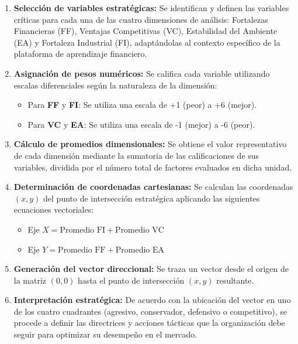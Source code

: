 \begin{enumerate}
	\item \textbf{Selección de variables estratégicas:} Se identifican y definen las variables críticas para cada una de las cuatro dimensiones de análisis: Fortalezas Financieras (FF), Ventajas Competitivas (VC), Estabilidad del Ambiente (EA) y Fortaleza Industrial (FI), adaptándolas al contexto específico de la plataforma de aprendizaje financiero.
	
	\item \textbf{Asignación de pesos numéricos:} Se califica cada variable utilizando escalas diferenciales según la naturaleza de la dimensión:
	\begin{itemize}
		\item Para \textbf{FF} y \textbf{FI}: Se utiliza una escala de +1 (peor) a +6 (mejor).
		\item Para \textbf{VC} y \textbf{EA}: Se utiliza una escala de -1 (mejor) a -6 (peor).
	\end{itemize}
	
	\item \textbf{Cálculo de promedios dimensionales:} Se obtiene el valor representativo de cada dimensión mediante la sumatoria de las calificaciones de sus variables, dividida por el número total de factores evaluados en dicha unidad.
	
	\item \textbf{Determinación de coordenadas cartesianas:} Se calculan las coordenadas $(x, y)$ del punto de intersección estratégica aplicando las siguientes ecuaciones vectoriales:
	\begin{itemize}
		\item Eje $X = \text{Promedio FI} + \text{Promedio VC}$
		\item Eje $Y = \text{Promedio FF} + \text{Promedio EA}$
	\end{itemize}
	
	\item \textbf{Generación del vector direccional:} Se traza un vector desde el origen de la matriz $(0,0)$ hasta el punto de intersección $(x, y)$ resultante. 
	
	\item \textbf{Interpretación estratégica:} De acuerdo con la ubicación del vector en uno de los cuatro cuadrantes (agresivo, conservador, defensivo o competitivo), se procede a definir las directrices y acciones tácticas que la organización debe seguir para optimizar su desempeño en el mercado.
\end{enumerate}

